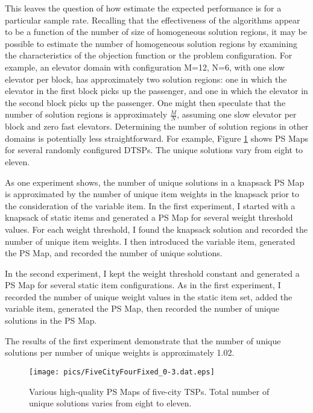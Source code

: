 
This leaves the question of how estimate the expected performance is for a particular sample rate. Recalling that the effectiveness of the algorithms appear to be a function of the number of size of homogeneous solution regions, it may be possible to estimate the number of homogeneous solution regions by examining the  characteristics of the objection function or the problem configuration.  For example, an elevator domain with configuration M=12, N=6, with one slow elevator per block, has approximately two solution regions:  one in which the elevator in the first block picks up the passenger, and one in which the elevator in the second block picks up the passenger.  One might then speculate that the  number of solution regions is approximately $\frac{M}{N}$, assuming one slow elevator per block and zero fast elevators.  Determining the number of solution regions in other domains is potentially less straightforward.  For example, Figure \ref{fig:five_city_tsps} shows PS Maps for several randomly configured DTSPs.  The unique solutions vary from eight to eleven.


As one experiment shows, the number of unique solutions in a knapsack PS Map is approximated by the number of unique item weights in the knapsack prior to the consideration of the variable item.  In the first experiment, I started with a knapsack of static items and generated a PS Map for several weight threshold values.  For each weight threshold, I found the knapsack solution and recorded the number of unique item weights.  I then introduced the variable item, generated the PS Map, and recorded the number of unique solutions.

In the second experiment, I kept the weight threshold constant and generated a PS Map for several static item  configurations.  As in the first experiment, I recorded the number of unique weight values in the static item set, added the variable item, generated the PS Map, then recorded the number of unique solutions in the PS Map.

The results of the first experiment demonstrate that the number of unique solutions per number of unique weights is approximately 1.02.




\begin{figure}
\begin{center}
\texttt{[image: pics/FiveCityFourFixed\_0-3.dat.eps]}
\caption{Various high-quality PS Maps of five-city TSPs.  Total number of unique solutions varies from eight to eleven.}
\label{fig:five_city_tsps}
\end{center}
\end{figure}


